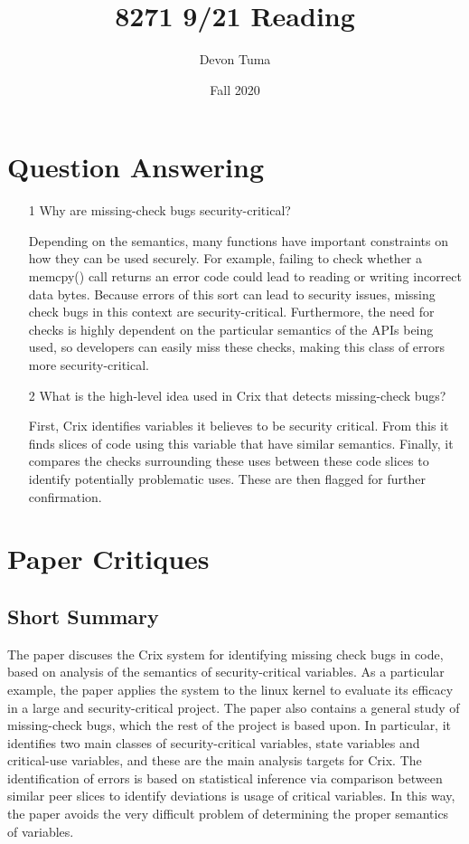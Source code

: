 \documentclass[11pt]{article}
\title{8271 9/21 Reading}
\author{Devon Tuma}
\date{Fall 2020}
\begin{document}
\maketitle

\section*{Question Answering}

\begin{itemize}
\item[1] Why are missing-check bugs security-critical?

  Depending on the semantics, many functions have important constraints on how they can be used securely. For example, failing to check whether a memcpy() call returns an error code could lead to reading or writing incorrect data bytes.
  Because errors of this sort can lead to security issues, missing check bugs in this context are security-critical. Furthermore, the need for checks is highly dependent on the particular semantics of the APIs being used, so developers can easily miss these checks, making this class of errors more security-critical.

\item[2] What is the high-level idea used in Crix that detects missing-check bugs?

  First, Crix identifies variables it believes to be security critical. From this it finds slices of code using this variable that have similar semantics. Finally, it compares the checks surrounding these uses between these code slices to identify potentially problematic uses. These are then flagged for further confirmation.
  
\end{itemize}

\section*{Paper Critiques}

\subsection*{Short Summary}

The paper discuses the Crix system for identifying missing check bugs in code, based on analysis of the semantics of security-critical variables. As a particular example, the paper applies the system to the linux kernel to evaluate its efficacy in a large and security-critical project. The paper also contains a general study of missing-check bugs, which the rest of the project is based upon. In particular, it identifies two main classes of security-critical variables, state variables and critical-use variables, and these are the main analysis targets for Crix.
The identification of errors is based on statistical inference via comparison between similar peer slices to identify deviations is usage of critical variables. In this way, the paper avoids the very difficult problem of determining the proper semantics of variables.
\end{document}
